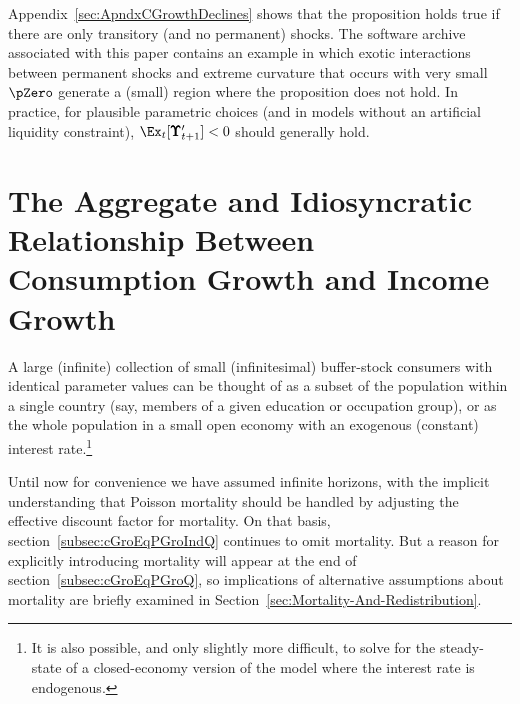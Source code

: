 \documentclass[BufferStockTheory]{subfiles}
\begin{document}
Appendix~\ref{sec:ApndxCGrowthDeclines} shows that the proposition holds true if there are only transitory (and no permanent) shocks.  The software archive associated with this paper contains an example in which exotic interactions between permanent shocks and extreme curvature that occurs with very small $\pZero$ generate a (small) region where the proposition does not hold.  In practice, for plausible parametric choices (and in models without an artificial liquidity constraint), $\Ex_{t}[\pmb{\Upsilon}_{t+1}^{\prime}]<0$ should generally hold.

\hypertarget{The-Aggregate-and-Idiosyncratic-Relationship-Between-Consumption-Growth-and-Income-Growth}{}
\section{The Aggregate and Idiosyncratic Relationship Between
  Consumption Growth and Income Growth}

A large (infinite) collection of small (infinitesimal) buffer-stock consumers with identical parameter values can be thought of as a subset of the population within a single country (say, members of a given education or occupation group), or as the whole population in a small open economy with an exogenous (constant) interest rate.\footnote{It is also possible, and only slightly more difficult, to solve for the steady-state of a closed-economy version of the model where the interest rate is endogenous.}

Until now for convenience we have assumed infinite horizons, with the implicit understanding that Poisson mortality should be handled by adjusting the effective discount factor for mortality.  On that basis, section~\ref{subsec:cGroEqPGroIndQ} continues to omit mortality.  But a reason for explicitly introducing mortality will appear at the end of section~\ref{subsec:cGroEqPGroQ}, so implications of alternative assumptions about mortality are briefly examined in Section~\ref{sec:Mortality-And-Redistribution}.
\end{document}
